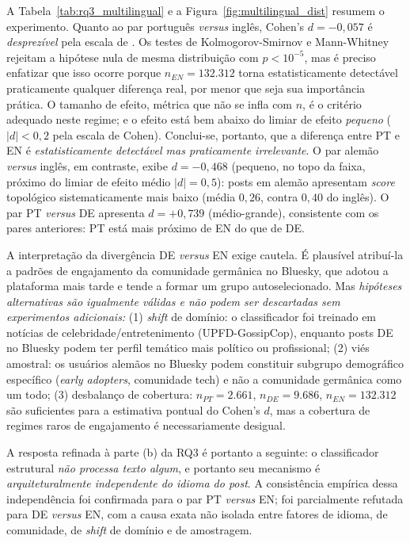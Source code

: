 A Tabela~\ref{tab:rq3_multilingual} e a Figura~\ref{fig:multilingual_dist}
resumem o experimento. Quanto ao par portugu\^es \emph{versus} ingl\^es,
Cohen's $d = -0{,}057$ \'e \emph{desprez\'ivel} pela escala de
\cite{cohen1988statistical}. Os testes de Kolmogorov-Smirnov e
Mann-Whitney rejeitam a hip\'otese nula de mesma distribui\c{c}\~ao com
$p < 10^{-5}$, mas \'e preciso enfatizar que isso ocorre porque
$n_{EN} = 132{.}312$ torna estatisticamente detect\'avel praticamente
qualquer diferen\c{c}a real, por menor que seja sua import\^ancia
pr\'atica. O tamanho de efeito, m\'etrica que n\~ao se infla com $n$,
\'e o crit\'erio adequado neste regime; e o efeito est\'a bem abaixo
do limiar de efeito \emph{pequeno} ($|d| < 0{,}2$ pela escala de Cohen).
Conclui-se, portanto, que a diferen\c{c}a entre PT e EN \'e
\emph{estatisticamente detect\'avel mas praticamente irrelevante}. O par
alem\~ao \emph{versus} ingl\^es, em contraste, exibe $d = -0{,}468$
(pequeno, no topo da faixa, pr\'oximo do limiar de efeito m\'edio
$|d|=0{,}5$): posts em alem\~ao apresentam \emph{score} topol\'ogico
sistematicamente mais baixo (m\'edia $0{,}26$, contra $0{,}40$ do
ingl\^es). O par PT \emph{versus} DE apresenta $d = +0{,}739$
(m\'edio-grande), consistente com os pares anteriores: PT est\'a mais
pr\'oximo de EN do que de DE.

A interpreta\c{c}\~ao da diverg\^encia DE \emph{versus} EN exige
cautela. \'E plaus\'ivel atribu\'i-la a padr\~oes de engajamento da
comunidade germ\^anica no Bluesky, que adotou a plataforma mais tarde e
tende a formar um grupo autoselecionado. Mas \emph{hip\'oteses
alternativas s\~ao igualmente v\'alidas e n\~ao podem ser descartadas
sem experimentos adicionais:} (1) \emph{shift} de dom\'inio: o
classificador foi treinado em not\'icias de celebridade/entretenimento
(UPFD-GossipCop), enquanto posts DE no Bluesky podem ter perfil
tem\'atico mais pol\'itico ou profissional; (2) vi\'es amostral: os
usu\'arios alem\~aos no Bluesky podem constituir subgrupo demogr\'afico
espec\'ifico (\emph{early adopters}, comunidade tech) e n\~ao a
comunidade germ\^anica como um todo; (3) desbalan\c{c}o de cobertura:
$n_{PT} = 2{.}661$, $n_{DE} = 9{.}686$, $n_{EN} = 132{.}312$ s\~ao
suficientes para a estimativa pontual do Cohen's $d$, mas a cobertura de
regimes raros de engajamento \'e necessariamente desigual.

A resposta refinada \`a parte (b) da RQ3 \'e portanto a seguinte: o
classificador estrutural \emph{n\~ao processa texto algum}, e portanto
seu mecanismo \'e \emph{arquiteturalmente independente do idioma do
post}. A consist\^encia emp\'irica dessa independ\^encia foi confirmada
para o par PT \emph{versus} EN; foi parcialmente refutada para DE
\emph{versus} EN, com a causa exata n\~ao isolada entre fatores de
idioma, de comunidade, de \emph{shift} de dom\'inio e de amostragem.

